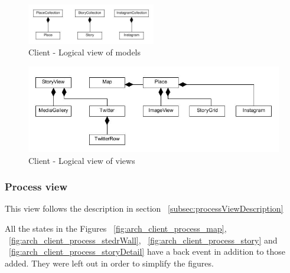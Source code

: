 \documentclass[11pt]{book}
\begin{document}
\begin{figure}[H]
      \centering
      \includegraphics[width=0.5\textwidth]{Figures/Architecture/clientLogicalModels.jpg}
      \caption{Client - Logical view of models}
      \label{fig:arch_client_logical_models}
\end{figure}

\begin{figure}[H]
      \centering
      \includegraphics[width=1.0\textwidth]{Figures/Architecture/clientLogicalViews.jpg}
      \caption{Client - Logical view of views}
      \label{fig:arch_client_logical_views}
\end{figure}

\subsubsection{Process view}
This view follows the description in section ~\ref{subsec:processViewDescription}

All the states in the Figures ~\ref{fig:arch_client_process_map}, ~\ref{fig:arch_client_process_stedrWall}, ~\ref{fig:arch_client_process_story} and ~\ref{fig:arch_client_process_storyDetail} have a back event in addition to those added. They were left out in order to simplify the figures.
\end{document}
